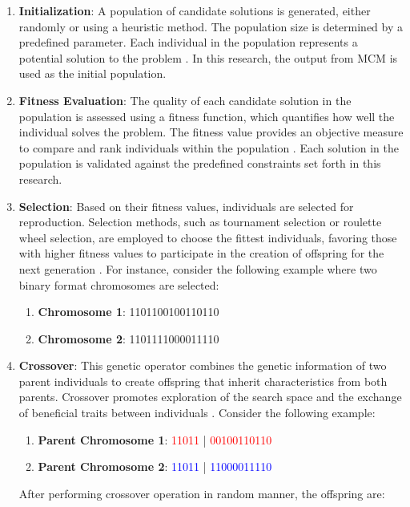 \begin{enumerate}
    \item \textbf{Initialization}: A population of candidate solutions is generated, either randomly or using a heuristic method. The population size is determined by a predefined parameter. Each individual in the population represents a potential solution to the problem \cite{norouzi2014genetic}. In this research, the output from \gls{MCM} is used as the initial population.
    \item \textbf{Fitness Evaluation}: The quality of each candidate solution in the population is assessed using a fitness function, which quantifies how well the individual solves the problem. The fitness value provides an objective measure to compare and rank individuals within the population \cite{norouzi2014genetic}. Each solution in the population is validated against the predefined constraints set forth in this research.
    \item \textbf{Selection}: Based on their fitness values, individuals are selected for reproduction. Selection methods, such as tournament selection or roulette wheel selection, are employed to choose the fittest individuals, favoring those with higher fitness values to participate in the creation of offspring for the next generation \cite{lambora2019genetic}. For instance, consider the following example where two binary format chromosomes are selected:
    \begin{enumerate}
        \item \textbf{Chromosome 1}: 1101100100110110
        \item \textbf{Chromosome 2}: 1101111000011110
    \end{enumerate}
    \item \textbf{Crossover}: This genetic operator combines the genetic information of two parent individuals to create offspring that inherit characteristics from both parents. Crossover promotes exploration of the search space and the exchange of beneficial traits between individuals \cite{lambora2019genetic}. Consider the following example:
    \begin{enumerate}
        \item \textbf{Parent Chromosome 1}: \textcolor{red}{11011} | \textcolor{red}{00100110110}
        \item \textbf{Parent Chromosome 2}: \textcolor{blue}{11011} | \textcolor{blue}{11000011110}
    \end{enumerate}
    After performing crossover operation in random manner, the offspring are:

\end{enumerate}
